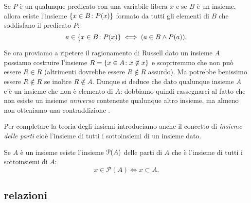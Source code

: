 \begin{axiom}[specificazione]
  Se $P$ è un qualunque predicato con una variabile libera $x$
  e se $B$ è un insieme, allora esiste l'insieme 
  $\ENCLOSE {x\in B\colon P(x)}$ formato 
  da tutti gli elementi di $B$ che soddisfano il predicato $P$:
\[
  a \in \ENCLOSE{x\in B\colon P(x)} \iff (a \in B \land P(a)).
\]
\end{axiom}

Se ora proviamo a ripetere il ragionamento di Russell dato un insieme $A$ 
possiamo costruire l'insieme $R=\ENCLOSE{x\in A\colon x\not \in x}$
e scopriremmo che non può essere $R\in R$ 
(altrimenti dovrebbe essere $R\not \in R$ assurdo).
Ma potrebbe benissimo essere $R\not \in R$ se inoltre $R\not \in A$.
Dunque si deduce che dato qualunque insieme $A$ c'è un insieme 
che non è elemento di $A$: dobbiamo quindi rassegnarci al fatto che non
esiste un insieme \emph{universo} contenente qualunque altro insieme,
ma almeno non otteniamo una contraddizione%
.


Per completare la teoria degli insiemi introduciamo anche il concetto di
\emph{insieme delle parti}%
%
% 
cioè l'insieme di tutti i sottoinsiemi di un insieme dato.
\begin{axiom}
\label{def:insieme_parti}%
Se $A$ è un insieme esiste l'insieme $\P(A)$ delle parti di $A$
che è l'insieme di tutti i sottoinsiemi di $A$:
\begin{equation}\label{eq:insieme_delle_parti}
  x \in \mathcal P(A) \iff x \subset A.
\end{equation}
\end{axiom}

\subsection{relazioni}

